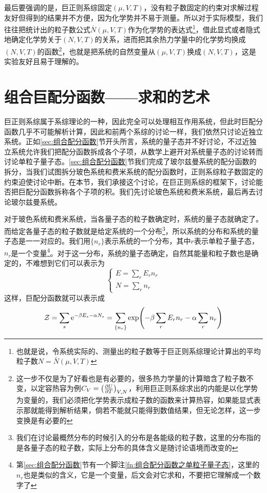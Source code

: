 \documentclass[../../main.tex]{subfiles}
\begin{document}
最后要强调的是，巨正则系综固定\((\mu,V,T)\)，没有粒子数固定的约束对求解过程友好但得到的结果并不方便，因为化学势并不易于测量。所以对于实际模型，我们往往把统计出的粒子数公式\(\bar{N}(\mu,V,T)\)作为化学势的表达式\footnote{也就是说，令系统实际的、测量出的粒子数等于巨正则系综理论计算出的平均粒子数\(N=\bar{N}(\mu,V,T)\)}，借此显式或者隐式地确定化学势关于\((N,V,T)\)的关系，进而把其余热力学量中的化学势均换成\((N,V,T)\)的函数\footnote{这一步不仅是为了好看也是有必要的，很多热力学量的计算暗含了粒子数不变，以定容热容为例\(C_V=\left(\pdv{U}{T}\right)_{V,N}\)，利用巨正则系综求出的内能是以化学势为变量的，我们必须把化学势表示成粒子数的函数来计算热容，如果能显式表示那就能得到解析结果，倘若不能就只能得到数值结果，但无论怎样，这一步变换是有必要的}，也就是把系统的自然变量从\((\mu,V,T)\)换成\((N,V,T)\)，这是实验友好且易于理解的。

\section{组合巨配分函数——求和的艺术}
巨正则系综属于系综理论的一种，因此完全可以处理相互作用系统，但此时巨配分函数几乎不可能解析计算，因此和前两个系综的讨论一样，我们依然只讨论近独立系统。正如\ref{sec:组合配分函数}节开头所言，系统的量子态并不好讨论，不过近独立系统允许我们把配分函数拆成各个子项，从数学上避开对系统量子态的讨论转而讨论单粒子量子态。\ref{sec:组合配分函数}节我们完成了玻尔兹曼系统的配分函数的拆分，当我们试图拆分玻色系统和费米系统的配分函数时，正则系综粒子数固定的约束迫使讨论中断。在本节，我们承接这个讨论，在巨正则系综的框架下，讨论能否把巨配分函数拆称各个子项的积。我们先讨论玻色系统和费米系统，最后再去讨论玻尔兹曼系统。

对于玻色系统和费米系统，当各量子态的粒子数确定时，系统的量子态就确定了。而给定各量子态的粒子数就是给定系统的一个分布\footnote{我们在讨论最概然分布的时候引入的分布是各能级的粒子数，这里的分布指的是各量子态的粒子数，实际上分布的具体含义是随讨论语境而改变的}，所以系统的分布和系统的量子态是一一对应的。我们用\(\{n_r\}\)表示系统的一个分布，其中\(r\)表示单粒子量子态，\(n_r\)是一个变量\footnote{第\ref{sec:组合配分函数}节有一个脚注\ref{fn:组合配分函数之单粒子量子态}，这里的\(n_r\)也是类似的含义，它是一个变量，后文会对它求和，不要把它理解成一个数字了}。对于这一分布，系统的量子态确定，自然其能量和粒子数也是确定的，不难想到它们可以表示为
\begin{equation}
    \begin{cases}
        \displaystyle E=\sum_r E_rn_r \\
        \displaystyle N=\sum_r n_r
    \end{cases}
\end{equation}
这样，巨配分函数就可以表示成
\begin{equation}
    \mathcal{Z}=\sum_s \mathrm{e}^{-\beta E_s-\alpha N_s}=\sum_{\{n_r\}}\exp(-\beta\sum_r E_rn_r-\alpha\sum_r n_r)
\end{equation}
\end{document}
